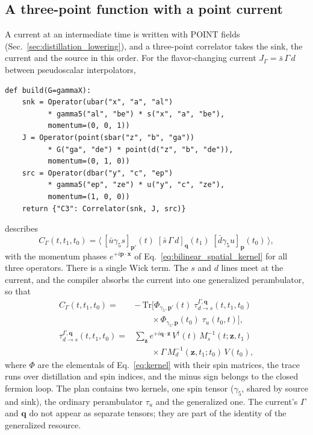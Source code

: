 \documentclass[a4paper,fleqn]{cas-dc}
\begin{document}
\begingroup\color{blue}
\subsection{A three-point function with a point current}
\label{sec:example_threept}

A current at an intermediate time is written with POINT fields
(Sec.~\ref{sec:distillation_lowering}), and a three-point correlator takes the
sink, the current and the source in this order. For the flavor-changing current
\(J_\Gamma=\bar s\,\Gamma\,d\) between pseudoscalar interpolators,
{\footnotesize
\begin{verbatim}
def build(G=gammaX):
    snk = Operator(ubar("x", "a", "al")
          * gamma5("al", "be") * s("x", "a", "be"),
          momentum=(0, 0, 1))
    J = Operator(point(sbar("z", "b", "ga"))
          * G("ga", "de") * point(d("z", "b", "de")),
          momentum=(0, 1, 0))
    src = Operator(dbar("y", "c", "ep")
          * gamma5("ep", "ze") * u("y", "c", "ze"),
          momentum=(1, 0, 0))
    return {"C3": Correlator(snk, J, src)}
\end{verbatim}
}
\noindent
describes
\begin{equation}
C_\Gamma(t,t_1,t_0)=\big\langle\, [\bar u\gamma_5 s]_{\mathbf p'}(t)\;
[\bar s\,\Gamma\,d]_{\mathbf q}(t_1)\; [\bar d\gamma_5 u]_{\mathbf p}(t_0)\,\big\rangle ,
\label{eq:threept_example}
\end{equation}
with the momentum phases \(e^{+i\mathbf p\cdot\mathbf x}\) of
Eq.~\eqref{eq:bilinear_spatial_kernel} for all three operators. There is a single
Wick term. The \(s\) and \(d\) lines meet at the current, and the compiler
absorbs the current into one generalized perambulator, so that
\begin{align}
C_\Gamma(t,t_1,t_0)={}&-\,\mathrm{Tr}\big[\Phi_{\gamma_5,\mathbf p'}(t)\;
\tau^{\Gamma,\mathbf q}_{d\to s}(t,t_1,t_0)\nonumber\\
&\qquad\times\Phi_{\gamma_5,\mathbf p}(t_0)\;\tau_u(t_0,t)\big],\\
\tau^{\Gamma,\mathbf q}_{d\to s}(t,t_1,t_0)={}&\sum_{\mathbf z}e^{+i\mathbf q\cdot\mathbf z}\,
V^\dagger(t)\,M_s^{-1}(t;\mathbf z,t_1)\nonumber\\
&\qquad\times\Gamma\,M_d^{-1}(\mathbf z,t_1;t_0)\,V(t_0),
\label{eq:generalized_peram}
\end{align}
where \(\Phi\) are the elementals of Eq.~\eqref{eq:kernel} with their spin matrices,
the trace runs over distillation and spin indices, and the minus sign belongs to
the closed fermion loop. The plan contains two kernels, one spin tensor
(\(\gamma_5\), shared by source and sink), the ordinary perambulator \(\tau_u\) and
the generalized one. The current's \(\Gamma\) and \(\mathbf q\) do not appear as
separate tensors; they are part of the identity of the generalized resource.
\end{document}
